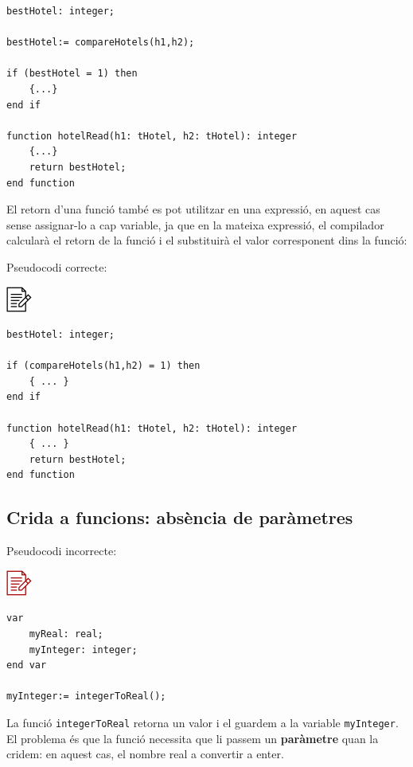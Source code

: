 \documentclass[
]{book}
\begin{document}
\begin{verbatim}
bestHotel: integer;

bestHotel:= compareHotels(h1,h2);

if (bestHotel = 1) then
    {...}
end if  

function hotelRead(h1: tHotel, h2: tHotel): integer
    {...}
    return bestHotel;
end function
\end{verbatim}

El retorn d'una funció també es pot utilitzar en una expressió, en aquest cas sense assignar-lo a cap variable, ja que en la mateixa expressió, el compilador calcularà el retorn de la funció i el substituirà el valor corresponent dins la funció:

Pseudocodi correcte:

\includegraphics{./img/alg.png}

\begin{verbatim}
bestHotel: integer;

if (compareHotels(h1,h2) = 1) then
    { ... }
end if  

function hotelRead(h1: tHotel, h2: tHotel): integer
    { ... }
    return bestHotel;
end function
\end{verbatim}

\hypertarget{crida-a-funcions-absuxe8ncia-de-paruxe0metres}{%
\subsection{Crida a funcions: absència de paràmetres}\label{crida-a-funcions-absuxe8ncia-de-paruxe0metres}}

Pseudocodi incorrecte:

\includegraphics{./img/alg_err.png}

\begin{verbatim}
var
    myReal: real;
    myInteger: integer;
end var

myInteger:= integerToReal();
\end{verbatim}

La funció \texttt{integerToReal} retorna un valor i el guardem a la variable \texttt{myInteger}. El problema és que la funció necessita que li passem un \textbf{paràmetre} quan la cridem: en aquest cas, el nombre real a convertir a enter.
\end{document}

